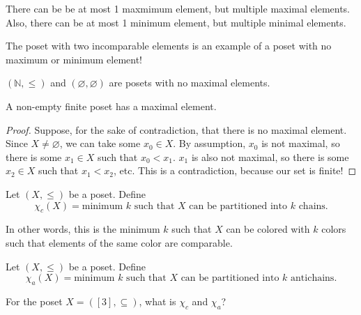 \begin{note}
	There can be be at most 1 maxmimum element, but multiple maximal elements. Also, there can be at most 1 minimum element, but multiple minimal elements.
\end{note}

\begin{note}
	The poset with two incomparable elements is an example of a poset with no maximum or minimum element!
\end{note}

\begin{eg}
	\( (\mathbb{N}, \le ) \) and \( (\varnothing, \varnothing) \) are posets with no maximal elements.
\end{eg}

\begin{prop}
	A non-empty finite poset has a maximal element.
\end{prop}

\begin{proof}
	Suppose, for the sake of contradiction, that there is no maximal element. Since \( X \neq \varnothing \), we can take some \( x_{0} \in X\). By assumption, \( x_{0} \) is not maximal, so there is some \( x_{1}\in X \) such that \( x_{0}<x_{1} \). \( x_{1} \) is also not maximal, so there is some \( x_{2} \in X \) such that \( x_{1}<x_{2} \), etc. This is a contradiction, because our set is finite!
\end{proof}

\begin{definition}
	Let \( (X,\le ) \) be a poset. Define \[
		\chi_c(X) = \text{minimum } k \text{ such that } X \text{ can be partitioned into } k \text{ chains}
	.\] 
\end{definition}

\begin{note}
	In other words, this is the minimum \( k \) such that \( X \) can be colored with \( k \) colors such that elements of the same color are comparable.
\end{note}

\begin{definition}
	Let \( (X,\le ) \) be a poset. Define \[
		\chi_a(X) = \text{minimum } k \text{ such that } X \text{ can be partitioned into } k \text{ antichains}
	.\] 
\end{definition}

\begin{eg}
	For the poset \( X=([3],\subseteq) \), what is \( \chi_c \) and \( \chi_a \)? 
\end{eg}

